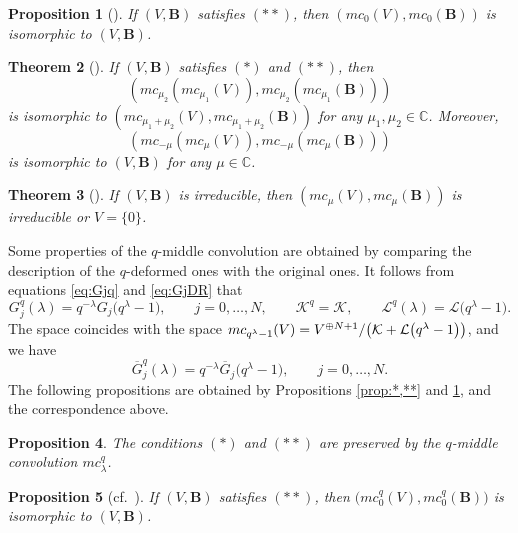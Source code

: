 \documentclass[pdftex]{sigma}
\numberwithin{equation}{section}
\newtheorem{Theorem}{Theorem}[section]
\newtheorem{Proposition}[Theorem]{Proposition}
\theoremstyle{definition}
\begin{document}
\begin{Proposition}[{\cite[Proposition 3.2]{DR1}}] \label{prop:mc0VV}
If $(V ,\boldsymbol{B}) $ satisfies $(**)$, then $(mc _{0} (V), mc _{0}(\boldsymbol{B})) $ is isomorphic to $(V ,\boldsymbol{B}) $.
\end{Proposition}
\begin{Theorem}[{\cite[Theorem 3.5]{DR1}}] \label{thm:mc12isom}
If $(V ,\boldsymbol{B}) $ satisfies $(*)$ and $(**)$, then
\[
(mc _{\mu _2} (mc _{\mu _1} (V)), mc _{\mu _2} (mc _{\mu _1} (\boldsymbol{B} )))
\]
is isomorphic to $(mc _{\mu _1 +\mu _2} (V), mc _{\mu _1 +\mu _2} (\boldsymbol{B} ))$ for any $\mu _1, \mu _2 \in \mathbb{C} $.
Moreover,
\[
(mc _{-\mu } (mc _{\mu } (V)), mc _{-\mu } (mc _{\mu } (\boldsymbol{B} )))
\]
 is isomorphic to $(V, \boldsymbol{B} )$ for any $\mu \in \mathbb{C} $.
\end{Theorem}
\begin{Theorem}[{\cite[Corollary 3.6]{DR1}}] \label{thm:irr}
If $(V,\boldsymbol{B})$ is irreducible, then $(mc _{\mu }(V), mc _{\mu } (\boldsymbol{B} ))$ is irreducible or $V=\{ 0 \}$.
\end{Theorem}

Some properties of the $q$-middle convolution are obtained by comparing the description of the $q$-deformed ones with the original ones.
It follows from equations \eqref{eq:Gjq} and \eqref{eq:GjDR} that
\begin{equation}
 G_j^{q} (\lambda ) = q^{-\lambda } G_j \bigl(q^{\lambda } -1 \bigr),\qquad j=0,\dots ,N,\qquad \mathcal{K}^{q} = \mathcal{K} , \qquad \mathcal{L}^{q} ( \lambda ) = \mathcal{L} \bigl(q^{\lambda } -1\bigr).  \label{eq:GjqlGjDR}
\end{equation}
The space  coincides with the space $\smash{mc_{q^{\lambda } -1} (V) = V^{\oplus N+1}}/\bigl( \mathcal{K} + \mathcal{L} \bigl(q^{\lambda } -1\bigr) \bigr) $, and we have
\begin{equation}
 \overline{G}_j^{q} (\lambda ) = q^{-\lambda } \overline{G}_j \bigl(q^{\lambda } -1 \bigr), \qquad j=0,\dots ,N. \label{eq:GjqlGjDRb}
\end{equation}
The following propositions are obtained by Propositions \ref{prop:*,**} and \ref{prop:mc0VV}, and the correspondence above.
\begin{Proposition}
The conditions $(*)$ and $(**)$ are preserved by the $q$-middle convolution $mc_\lambda ^{q} $.
\end{Proposition}
\begin{Proposition}[{cf.~\cite[Proposition 3.2]{DR1}}] \label{prop:qmc0VV}
If $(V ,\boldsymbol{B}) $ satisfies $(**)$, then $\bigl(mc ^{q}_{0} (V), mc ^{q}_{0}(\boldsymbol{B})\bigr) $ is isomorphic to $(V ,\boldsymbol{B}) $.
\end{Proposition}
\end{document}

